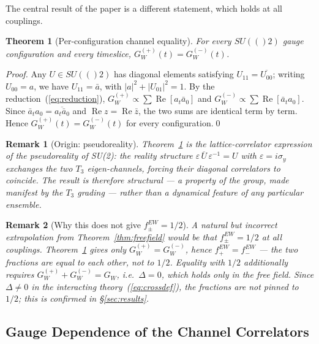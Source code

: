 \documentclass[12pt,a4paper]{article}
\newtheorem{theorem}{Theorem}[section]
\newtheorem{remark}{Remark}[section]
\newcommand{\SU}{\mathrm{SU}}
\renewcommand{\Re}{\operatorname{Re}}
\newcommand{\GW}[1]{G_W^{(#1)}}
\newcommand{\fEW}[1]{f_{#1}^{\mathrm{EW}}}
\def\SU#1{SU(#1)}%
\def\mathrm#1{#1}%
\begin{document}
	The central result of the paper is a different statement, which holds at all
	couplings.
	
	\begin{theorem}[Per-configuration channel equality]\label{thm:channel}
		For every $\SU(2)$ gauge configuration and every timeslice,
		$\GW{+}(t)=\GW{-}(t)$.
	\end{theorem}
	
	\begin{proof}
		Any $U\in\SU(2)$ has diagonal elements satisfying $U_{11}=\overline{U_{00}}$;
		writing $U_{00}=a$, we have $U_{11}=\bar a$, with $|a|^2+|U_{01}|^2=1$.  By the
		reduction~(\ref{eq:reduction}), $\GW{+}\propto\sum\Re[a_t\bar a_0]$ and
		$\GW{-}\propto\sum\Re[\bar a_t a_0]$.  Since $\bar a_t a_0=\overline{a_t\bar a_0}$
		and $\Re z=\Re\bar z$, the two sums are identical term by term.  Hence
		$\GW{+}(t)=\GW{-}(t)$ for every configuration.\qed
	\end{proof}
	
	\begin{remark}[Origin: pseudoreality]
		Theorem~\ref{thm:channel} is the lattice-correlator expression of the
		pseudoreality of SU(2): the reality structure $\varepsilon\,\overline{U}\,
		\varepsilon^{-1}=U$ with $\varepsilon=i\sigma_y$ exchanges the two $T_3$
		eigen-channels, forcing their diagonal correlators to coincide.  The result is
		therefore structural --- a property of the group, made manifest by the $T_3$
		grading --- rather than a dynamical feature of any particular ensemble.
	\end{remark}
	
	\begin{remark}[Why this does not give $\fEW{\pm}=1/2$]
		A natural but incorrect extrapolation from Theorem~\ref{thm:freefield} would be
		that $\fEW{\pm}=1/2$ at all couplings.  Theorem~\ref{thm:channel} gives only
		$\GW{+}=\GW{-}$, hence $\fEW{+}=\fEW{-}$ --- the two fractions are equal to each
		other, not to $1/2$.  Equality with $1/2$ additionally requires
		$\GW{+}+\GW{-}=G_W$, i.e.\ $\Delta=0$, which holds only in the free field.  Since
		$\Delta\neq0$ in the interacting theory~(\ref{eq:crossdef}), the fractions are not
		pinned to $1/2$; this is confirmed in \S\ref{sec:results}.
	\end{remark}
	
	\subsection{Gauge Dependence of the Channel Correlators}
	\label{sec:gauge}
	
\end{document}
